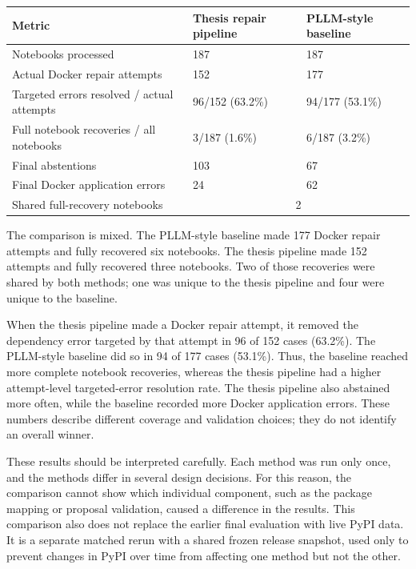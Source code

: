 {\small
\renewcommand{\arraystretch}{1.1}
\begin{center}
\begin{tabular}{|p{4.6cm}|p{3.35cm}|p{3.35cm}|}
  \hline
  \textbf{Metric} & \textbf{Thesis repair pipeline} &
  \textbf{PLLM-style baseline} \\
  \hline
  Notebooks processed & 187 & 187 \\
  \hline
  Actual Docker repair attempts & 152 & 177 \\
  \hline
  Targeted errors resolved / actual attempts &
  96/152 (63.2\%) & 94/177 (53.1\%) \\
  \hline
  Full notebook recoveries / all notebooks &
  3/187 (1.6\%) & 6/187 (3.2\%) \\
  \hline
  Final abstentions & 103 & 67 \\
  \hline
  Final Docker application errors & 24 & 62 \\
  \hline
  Shared full-recovery notebooks & \multicolumn{2}{c|}{2} \\
  \hline
\end{tabular}
\label{tab:v-pllm-comparison}
\end{center}
}

The comparison is mixed. The PLLM-style baseline made 177 Docker repair
attempts and fully recovered six notebooks. The thesis pipeline made 152
attempts and fully recovered three notebooks. Two of those recoveries were
shared by both methods; one was unique to the thesis pipeline and four were
unique to the baseline.

When the thesis pipeline made a Docker repair attempt, it removed the
dependency error targeted by that attempt in 96 of 152 cases (63.2\%). The
PLLM-style baseline did so in 94 of 177 cases (53.1\%). Thus, the baseline
reached more complete notebook recoveries, whereas the thesis pipeline had a
higher attempt-level targeted-error resolution rate. The thesis pipeline also
abstained more often, while the baseline recorded more Docker application
errors. These numbers describe different coverage and validation choices; they
do not identify an overall winner.

These results should be interpreted carefully. Each method was run only
once, and the methods differ in several design decisions. For this reason,
the comparison cannot show which individual component, such as the package
mapping or proposal validation, caused a difference in the results. This 
comparison also does not replace the earlier final evaluation with live
PyPI data. It is a separate matched rerun with a shared frozen release
snapshot, used only to prevent changes in PyPI over time from affecting one
method but not the other.


